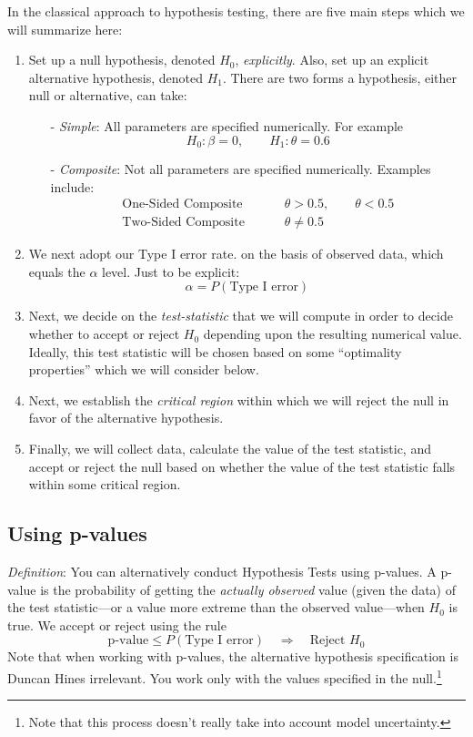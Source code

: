 \documentclass[12pt]{article}
\theoremstyle{plain}
\theoremstyle{definition}
\theoremstyle{remark}
\begin{document}
In the classical approach to hypothesis testing, there are five
main steps which we will summarize here:
\begin{enumerate}
   \item Set up a null hypothesis, denoted $H_0$, \emph{explicitly}.
      Also, set up an explicit alternative hypothesis, denoted
      $H_1$. There are two forms a hypothesis, either null or
      alternative, can take:
      \begin{itemize}
	 \item[-] {\sl Simple}: All parameters are specified
	    numerically. For example
	    \[ H_0: \beta = 0, \qquad H_1:\theta = 0.6\]
	 \item[-] {\sl Composite}: Not all parameters are specified
	    numerically. Examples include:
	    \begin{align*}
	       \text{One-Sided Composite } \qquad& \theta > 0.5,
	       \qquad \theta < 0.5\\
	       \text{Two-Sided Composite } \qquad& \theta \neq 0.5
	    \end{align*}
      \end{itemize}
   \item We next adopt our Type I error rate.
      on the basis of observed data,  which equals the
      $\alpha$ level. Just to be explicit:
	 \[ \alpha = P(\text{Type I error}) \]
   \item Next, we decide on the \emph{test-statistic} that we
      will compute in order to decide whether to accept or reject
      $H_0$ depending upon the resulting numerical value. Ideally,
      this test statistic will be chosen based on some
      ``optimality properties'' which we will consider below.
   \item Next, we establish the \emph{critical region} within
      which we will reject the null in favor of the alternative
      hypothesis.
   \item Finally, we will collect data, calculate the value of the
      test statistic, and accept or reject the null based on
      whether the value of the test statistic falls within some
      critical region.
\end{enumerate}

\subsection{Using p-values}

{\sl Definition}: You can alternatively conduct Hypothesis Tests using
p-values. A p-value is the probability of getting the
\emph{actually observed} value (given the data) of the test
statistic---or a value more extreme than the observed value---when
$H_0$ is true. We accept or reject using the rule
\[ \text{p-value} \leq P(\text{Type I error}) \quad
   \Rightarrow \quad \text{Reject $H_0$} \]
Note that when working with p-values, the alternative hypothesis
specification is Duncan Hines irrelevant. You work only with the
values specified in the null.\footnote{Note that this process doesn't
really take into account model uncertainty.}
\end{document}
